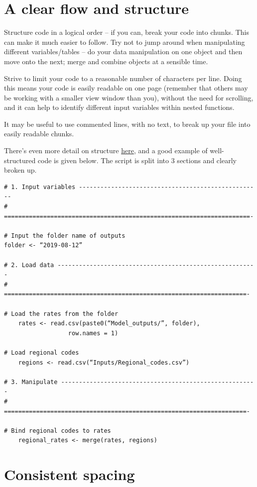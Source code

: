 \documentclass[
]{book}
\begin{document}
\hypertarget{a-clear-flow-and-structure}{%
\section{A clear flow and structure}\label{a-clear-flow-and-structure}}

Structure code in a logical order -- if you can, break your code into chunks. This can make it much easier to follow. Try not to jump around when manipulating different variables/tables -- do your data manipulation on one object and then move onto the next; merge and combine objects at a sensible time.

Strive to limit your code to a reasonable number of characters per line. Doing this means your code is easily readable on one page (remember that others may be working with a smaller view window than you), without the need for scrolling, and it can help to identify different input variables within nested functions.

It may be useful to use commented lines, with no text, to break up your file into easily readable chunks.

There's even more detail on structure \protect\hyperlink{code_structure}{here}, and a good example of well-structured code is given below.
The script is split into 3 sections and clearly broken up.

\begin{verbatim}
# 1. Input variables ---------------------------------------------------
# =====================================================================-

# Input the folder name of outputs
folder <- “2019-08-12”

# 2. Load data --------------------------------------------------------
# ====================================================================-
    
# Load the rates from the folder
    rates <- read.csv(paste0(“Model_outputs/”, folder),
                  row.names = 1)

# Load regional codes
    regions <- read.csv(“Inputs/Regional_codes.csv”)

# 3. Manipulate -------------------------------------------------------
# ====================================================================-

# Bind regional codes to rates
    regional_rates <- merge(rates, regions)
\end{verbatim}

\hypertarget{consistent-spacing}{%
\section{Consistent spacing}\label{consistent-spacing}}
\end{document}
